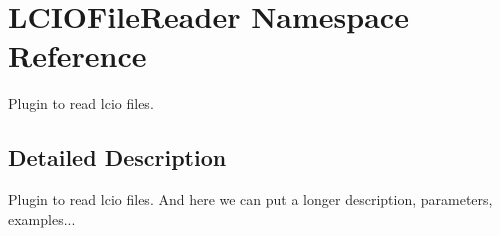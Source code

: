 \hypertarget{namespace_l_c_i_o_file_reader}{
\section{LCIOFileReader Namespace Reference}
\label{namespace_l_c_i_o_file_reader}
}


Plugin to read lcio files.  


\subsection{Detailed Description}
Plugin to read lcio files. And here we can put a longer description, parameters, examples... 